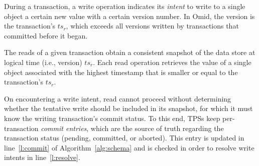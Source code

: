  During a transaction, a write operation indicates its \emph{intent} to write to a single object a certain new value with a certain version number.
In Omid, the version is the transaction's $ts_r$, which exceeds all versions written by transactions that committed before it  began. 

The reads of a given transaction obtain a consistent snapshot of the data store at logical time (i.e., version) $ts_r$.
Each read operation retrieves the value of a single object associated with the highest timestamp that is 
smaller or equal to the transaction's $ts_r$. 

On encountering a write intent, read cannot proceed without determining whether the tentative write should be included in its snapshot,
for which it must know the writing transaction's commit status. 
To this end, TPSs keep per-transaction \emph{commit entries}, which are the source of truth regarding the transaction status 
(pending, committed, or aborted). 
This entry is updated in line~\ref{l:commit} of Algorithm~\ref{alg:schema} 
and is checked in order to resolve write intents in line~\ref{l:resolve}.


